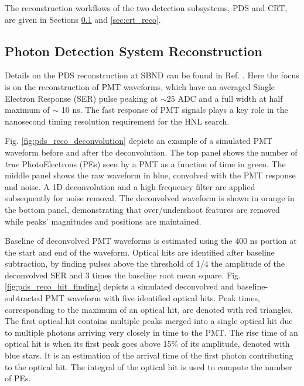 The reconstruction workflows of the two detection subsystems, PDS and CRT, are given in Sections \ref{sec:reco_pds} and \ref{sec:crt_reco}. 

\subsection{Photon Detection System Reconstruction}
\label{sec:reco_pds}

Details on the PDS reconstruction at SBND can be found in Ref. \cite{sbnd_pds_paper}.
Here the focus is on the reconstruction of PMT waveforms, which have an averaged Single Electron Response (SER) pulse peaking at $\sim 25$ ADC and a full width at half maximum of $\sim$ 10 ns.
The fast response of PMT signals plays a key role in the nanosecond timing resolution requirement for the HNL search.

Fig. \ref{fig:pds_reco_deconvolution} depicts an example of a simulated PMT waveform before and after the deconvolution.%
The top panel shows the number of \textit{true} PhotoElectrons (PEs) seen by a PMT as a function of time in green.
The middle panel shows the raw waveform in blue, convolved with the PMT response and noise.
A 1D deconvolution and a high frequency filter are applied subsequently for noise removal.
The deconvolved waveform is shown in orange in the bottom panel, demonstrating that over/undershoot features are removed while peaks' magnitudes and positions are maintained.

Baseline of deconvolved PMT waveforms is estimated using the 400 ns portion at the start and end of the waveform.
Optical hits are identified after baseline subtraction, by finding pulses above the threshold of $1/4$ the amplitude of the deconvolved SER and 3 times the baseline root mean square.
Fig. \ref{fig:pds_reco_hit_finding} depicts a simulated deconvolved and baseline-subtracted PMT waveform with five identified optical hits.
Peak times, corresponding to the maximum of an optical hit, are denoted with red triangles.
The first optical hit contains multiple peaks merged into a single optical hit due to multiple photons arriving very closely in time to the PMT.
The rise time of an optical hit is when its first peak goes above 15\% of its amplitude, denoted with blue stars.
It is an estimation of the arrival time of the first photon contributing to the optical hit. 
The integral of the optical hit is used to compute the number of PEs.

